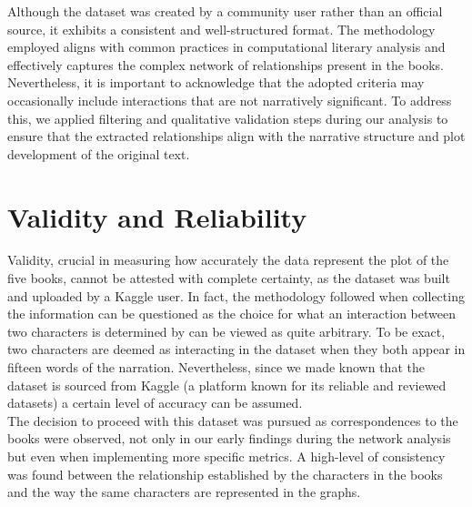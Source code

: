 \documentclass[12pt, a4paper]{article}
\begin{document}
Although the dataset was created by a community user rather than an official source, it exhibits a consistent and well-structured format. The methodology employed aligns with common practices in computational literary analysis and effectively captures the complex network of relationships present in the books. Nevertheless, it is important to acknowledge that the adopted criteria may occasionally include interactions that are not narratively significant. To address this, we applied filtering and qualitative validation steps during our analysis to ensure that the extracted relationships align with the narrative structure and plot development of the original text.


\section{Validity and Reliability}
\begin{comment}
(Spiegare il fatto che il dataset sia cotruito da un utente di Kaggle e quindi puo' essere non preciso, ma osservare anche che essendo preso da Kaggle ha soprattutto dopo il calcolo delle metriche abbiamo comunque osservato che c'e' coerenza con quanto scritto nei libri. clique servono come conferma della coerenza del dataset con la trama dei 5 libri)
How closely does the model of your dataset represent reality (validity)?
How does the way you treat the data affect the reproducibility of the study (reliability)?
\end{comment}
\label{validity-and-reliability-not-needed-for-the-project-proposal}
Validity, crucial in measuring how accurately the data represent the plot of the five books, cannot be attested with complete certainty, as the dataset was built and uploaded by a Kaggle user.
In fact, the methodology followed when collecting the information can be questioned as the choice for what an interaction between two characters is determined by can be viewed as quite arbitrary. To be exact, two characters are deemed as interacting in the dataset when they both appear in fifteen words of the narration. Nevertheless, since we made known that the dataset is sourced from Kaggle (a platform known for its reliable and reviewed datasets) a certain level of accuracy can be assumed. \\
The decision to proceed with this dataset was pursued as correspondences to the books were observed, not only in our early findings during the network analysis but even when implementing more specific metrics. A high-level of consistency was found between the relationship established by the characters in the books and the way the same characters are represented in the graphs.
\end{document}
